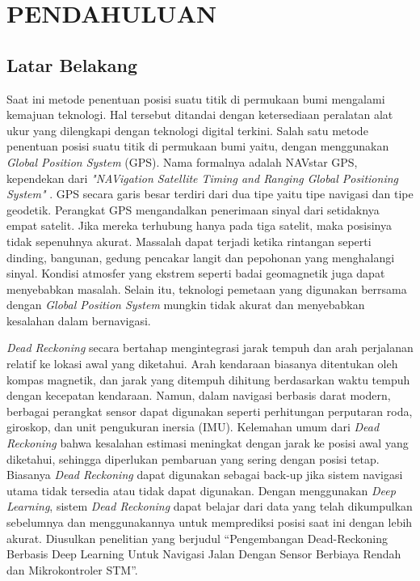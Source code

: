 \chapter{PENDAHULUAN}

\section{Latar Belakang}

Saat ini metode penentuan posisi suatu titik di permukaan bumi mengalami kemajuan teknologi.
Hal tersebut ditandai dengan ketersediaan peralatan alat ukur yang dilengkapi dengan teknologi digital terkini.
Salah satu metode penentuan posisi suatu titik di permukaan bumi yaitu, dengan menggunakan \emph{Global Position System} (GPS).
Nama formalnya adalah NAVstar GPS, kependekan dari \emph{"NAVigation Satellite Timing and Ranging Global Positioning System"} \parencite{Abidin2007}.
GPS secara garis besar terdiri dari dua tipe yaitu tipe navigasi dan tipe geodetik. Perangkat GPS mengandalkan penerimaan sinyal dari setidaknya empat satelit.
Jika mereka terhubung hanya pada tiga satelit, maka posisinya tidak sepenuhnya akurat. 
Massalah dapat terjadi ketika rintangan seperti dinding, bangunan, gedung pencakar langit dan pepohonan yang menghalangi sinyal.
Kondisi atmosfer yang ekstrem seperti badai geomagnetik juga dapat menyebabkan masalah. Selain itu, teknologi pemetaan yang digunakan berrsama dengan \emph{Global Position System}
mungkin tidak akurat dan menyebabkan kesalahan dalam bernavigasi.

\emph{Dead Reckoning} secara bertahap mengintegrasi jarak tempuh dan arah perjalanan relatif ke lokasi awal yang diketahui.
Arah kendaraan biasanya ditentukan oleh kompas magnetik, dan jarak yang ditempuh dihitung berdasarkan waktu tempuh dengan kecepatan kendaraan. 
Namun, dalam navigasi berbasis darat modern, berbagai perangkat sensor dapat digunakan seperti perhitungan perputaran roda, giroskop, dan unit pengukuran inersia (IMU).
Kelemahan umum dari \emph{Dead Reckoning} bahwa kesalahan estimasi meningkat dengan jarak ke posisi awal yang diketahui, sehingga diperlukan pembaruan yang sering dengan posisi tetap.
Biasanya \emph{Dead Reckoning} dapat digunakan sebagai back-up jika sistem navigasi utama tidak tersedia atau tidak dapat digunakan.
Dengan menggunakan \emph{Deep Learning}, sistem \emph{Dead Reckoning} dapat belajar dari data yang telah dikumpulkan sebelumnya dan menggunakannya untuk memprediksi posisi saat ini dengan lebih akurat.
Diusulkan penelitian yang berjudul “Pengembangan Dead-Reckoning Berbasis Deep Learning Untuk Navigasi Jalan Dengan Sensor Berbiaya Rendah dan Mikrokontroler STM”.

